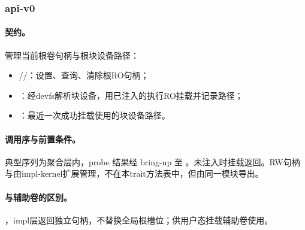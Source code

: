 
\subsubsection{api-v0}

\paragraph{契约。}
管理当前根卷句柄与根块设备路径：
\begin{itemize}
 \item {}//：设置、查询、清除根RO句柄；
 \item {}：经devfs解析块设备，用已注入的执行RO挂载并记录路径；
 \item {}：最近一次成功挂载使用的块设备路径。
\end{itemize}

\paragraph{调用序与前置条件。}
典型序列为聚合层内，probe 结果经 bring-up 至 。未注入时挂载返回。RW句柄与由impl-kernel扩展管理，不在本trait方法表中，但由同一模块导出。

\paragraph{与辅助卷的区别。}
，impl层返回独立句柄，不替换全局根槽位；供用户态挂载辅助卷使用。
